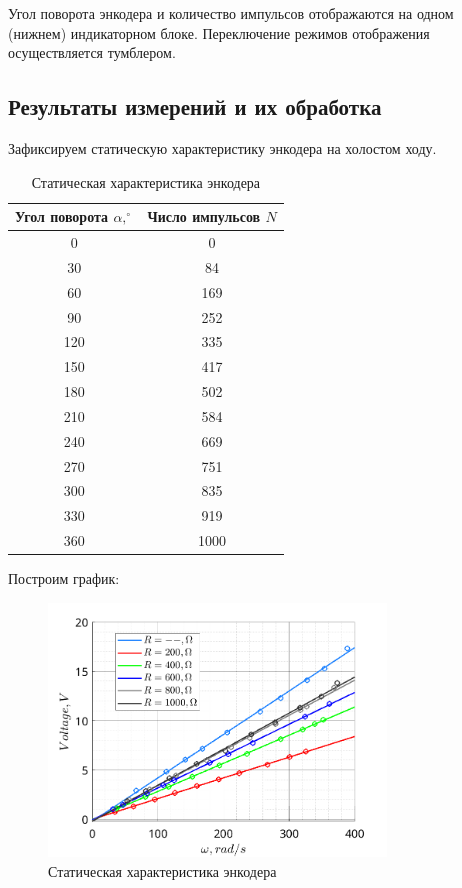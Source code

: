 Угол поворота энкодера и количество импульсов отображаются на одном (нижнем) индикаторном блоке.
Переключение режимов отображения осуществляется тумблером.

\subsection{Результаты измерений и их обработка}
Зафиксируем статическую характеристику энкодера на холостом ходу.
\begin{table}[!h]
    \centering
    \caption{Статическая характеристика энкодера}
    \label{tab:tabl}
    \begin{tabular}{|c|c|}
        \hline
        Угол поворота $\alpha,^\circ$& Число импульсов $N$ \\\hline
        0&	0\\
        30&	84\\
        60&	169\\
        90&	252\\
        120&	335\\
        150&	417\\
        180&	502\\
        210&	584\\
        240&	669\\
        270&	751\\
        300&	835\\
        330&	919\\
        360&	1000\\
        \hline
    \end{tabular}
\end{table}

Построим график:

\begin{figure}[!h]
    \centering
    \includegraphics[width=0.8\textwidth]{img/task1_r_0}
    \caption{Статическая характеристика энкодера }
    \label{fig:task1_r_0}
\end{figure}

